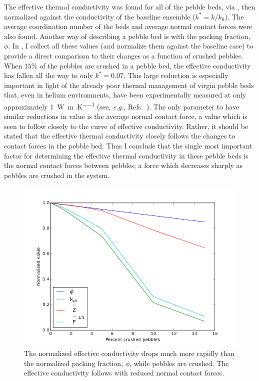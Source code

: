 The effective thermal conductivity was found for all of the pebble beds, via , then normalized against the conductivity of the baseline ensemble ($k^* = k/k_\text{0}$). The average coordination number of the beds and average normal contact forces were also found. Another way of describing a pebble bed is with the packing fraction, $\phi$. In , I collect all these values (and normalize them against the baseline case) to provide a direct comparison to their changes as a function of crushed pebbles. When $15\%$ of the pebbles are crushed in a pebble bed, the effective conductivity has fallen all the way to only $k^*=0.07$. This large reduction is especially important in light of the already poor thermal management of virgin pebble beds that, even in helium environments, have been experimentally measured at only approximately \SI{1}{\watt\per\meter\per\kelvin} (see, \textit{ e.g.}, Refs.~\cite{Reimann:2002mi, Piazza2002811}). The only parameter to have similar reductions in value is the average normal contact force, a value which is seen to follow closely to the curve of effective conductivity. Rather, it should be stated that the effective thermal conductivity closely follows the changes to contact forces in the pebble bed. Thus I conclude that the single most important factor for determining the effective thermal conductivity in these pebble beds is the normal contact forces between pebbles; a force which decreases sharply as pebbles are crushed in the system.

\begin{figure}[!ht]
    \centering
    \includegraphics[width=\singleimagewidth]{figures/kEff_packingFraction}
    \caption{The normalized effective conductivity drops much more rapidly than the normalized packing fraction, $\phi$, while pebbles are crushed. The effective conductivity follows with reduced normal contact forces.}
\label{fig:packing-fraction}
\end{figure}

